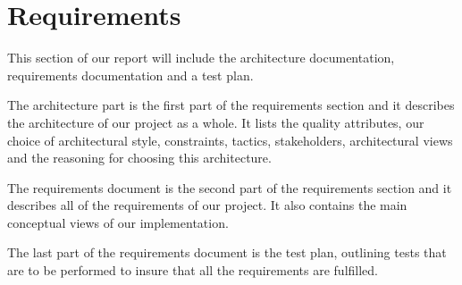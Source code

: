\documentclass[../document.tex]{subfiles}
\begin{document}
\section*{Requirements}

This section of our report will include the architecture documentation, requirements documentation and a test plan.

The architecture part is the first part of the requirements section and it describes the architecture of our project as a whole. It lists the quality attributes, our choice of architectural style, constraints, tactics, stakeholders, architectural views and the reasoning for choosing this architecture.

The requirements document is the second part of the requirements section and it describes all of the requirements of our project. It also contains the main conceptual views of our implementation.

The last part of the requirements document is the test plan, outlining tests that are to be performed to insure that all the requirements are fulfilled.
\end{document}
